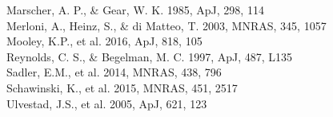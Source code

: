 \documentclass[utf8]{frontiersSCNS} %
\begin{document}
Marscher, A. P., \& Gear, W. K. 1985, ApJ, 298, 114\\
Merloni, A., Heinz, S., \& di Matteo, T. 2003, MNRAS, 345, 1057\\
Mooley, K.P., et al. 2016, ApJ, 818, 105\\
Reynolds, C. S., \& Begelman, M. C. 1997, ApJ, 487, L135\\
Sadler, E.M., et al. 2014, MNRAS, 438, 796\\
Schawinski, K., et al. 2015, MNRAS, 451, 2517\\
Ulvestad, J.S., et al. 2005, ApJ, 621, 123


\end{document}
